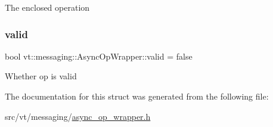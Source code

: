 The enclosed operation \mbox{\label{structvt_1_1messaging_1_1_async_op_wrapper_a040e00648d1bb44428dac609671ef2ae}} 
\subsubsection{\texorpdfstring{valid}{valid}}
{\footnotesize\ttfamily bool vt\+::messaging\+::\+Async\+Op\+Wrapper\+::valid = false}

Whether op is valid 

The documentation for this struct was generated from the following file\+:\begin{DoxyCompactItemize}
\item 
src/vt/messaging/\hyperlink{async__op__wrapper_8h}{async\+\_\+op\+\_\+wrapper.\+h}\end{DoxyCompactItemize}
